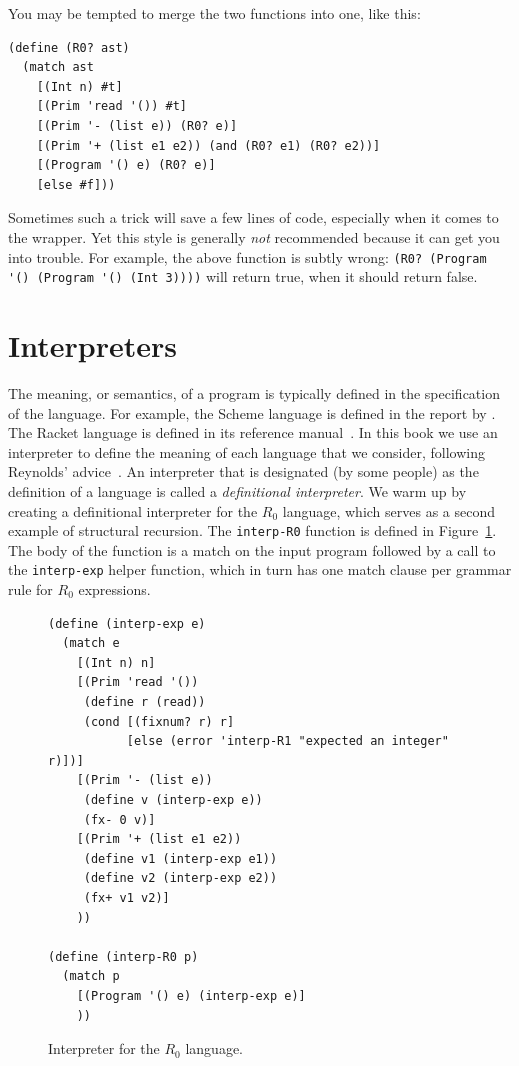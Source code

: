 \documentclass[11pt]{book}
\begin{document}
You may be tempted to merge the two functions into one, like this:
\begin{center}
\begin{minipage}{0.5\textwidth}
\begin{lstlisting}
(define (R0? ast)
  (match ast
    [(Int n) #t]
    [(Prim 'read '()) #t]
    [(Prim '- (list e)) (R0? e)]
    [(Prim '+ (list e1 e2)) (and (R0? e1) (R0? e2))]
    [(Program '() e) (R0? e)]
    [else #f]))
\end{lstlisting}
\end{minipage}
\end{center}
%
Sometimes such a trick will save a few lines of code, especially when
it comes to the  wrapper.  Yet this style is generally
\emph{not} recommended because it can get you into trouble.
%
For example, the above function is subtly wrong:
\lstinline{(R0? (Program '() (Program '() (Int 3))))}
will return true, when it should return false.



\section{Interpreters}
\label{sec:interp-R0}

The meaning, or semantics, of a program is typically defined in the
specification of the language. For example, the Scheme language is
defined in the report by \cite{SPERBER:2009aa}. The Racket language is
defined in its reference manual~\citep{plt-tr}. In this book we use an
interpreter to define the meaning of each language that we consider,
following Reynolds' advice~\citep{reynolds72:_def_interp}. An
interpreter that is designated (by some people) as the definition of a
language is called a \emph{definitional interpreter}.  We warm up by
creating a definitional interpreter for the $R_0$ language, which
serves as a second example of structural recursion. The
\texttt{interp-R0} function is defined in
Figure~\ref{fig:interp-R0}. The body of the function is a match on the
input program followed by a call to the \lstinline{interp-exp} helper
function, which in turn has one match clause per grammar rule for
$R_0$ expressions.

\begin{figure}[tbp]
\begin{lstlisting}
(define (interp-exp e)
  (match e
    [(Int n) n]
    [(Prim 'read '())
     (define r (read))
     (cond [(fixnum? r) r]
           [else (error 'interp-R1 "expected an integer" r)])]
    [(Prim '- (list e))
     (define v (interp-exp e))
     (fx- 0 v)]
    [(Prim '+ (list e1 e2))
     (define v1 (interp-exp e1))
     (define v2 (interp-exp e2))
     (fx+ v1 v2)]
    ))

(define (interp-R0 p)
  (match p
    [(Program '() e) (interp-exp e)]
    ))
\end{lstlisting}
\caption{Interpreter for the $R_0$ language.}
\label{fig:interp-R0}
\end{figure}
\end{document}
